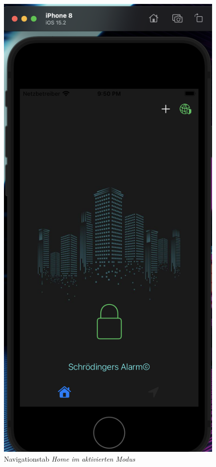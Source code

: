\begin{figure} [H]
	\begin{center}
		\includegraphics[width=045\textwidth]{Bilder/iOS_home.png}
		\caption{Navigationstab \textit{Home im aktivierten Modus}}
		\label{lock}
	\end{center}
\end{figure}
